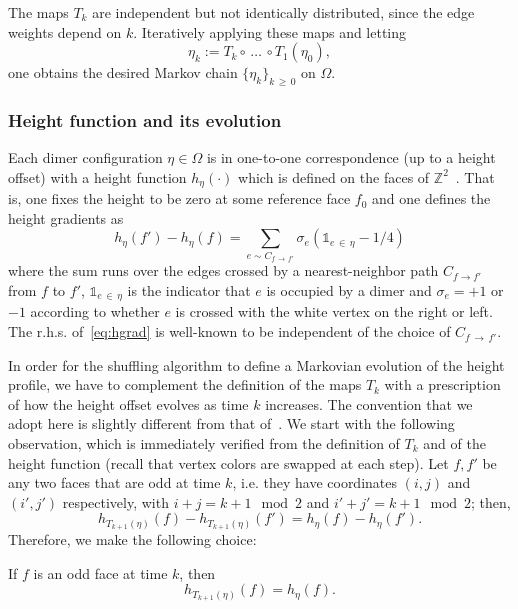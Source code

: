 \documentclass[AHL,Unicode,longabstracts,published]{cedram}
\newcommand{\bbZ}{\mathbb{Z}}
\newcommand{\dsun}{\mathds{1}}
\begin{document}
The maps $T_k$ are independent but not identically distributed, since the edge weights depend on $k$. Iteratively applying these maps and letting
\[
\eta_k:=T_{k}\circ\,\dots\,\circ T_1(\eta_0),
\]
one obtains the desired Markov chain $\{\eta_k\}_{k\,\ge\,0}$ on $\Omega$.

\subsubsection{Height function and its evolution}
Each dimer configuration $\eta\in \Omega$ is in one-to-one correspondence (up to a height offset) with a height function $h_\eta(\cdot)$ which is defined on the faces of $\bbZ^2$~\cite{KenLectures}. That is, one fixes the height to be zero at some reference face $f_0$ and one defines the height gradients as
\begin{equation}\label{eq:hgrad}
h_\eta(f')-h_\eta(f)=\sum_{e\sim C_{f\,\to\,f'}}\sigma_e (\dsun_{e\,\in\,\eta}-1/4)
\end{equation}
where the sum runs over the edges crossed by a nearest-neighbor path $C_{f\to f'}$ from $f$ to $f'$, $\dsun_{e\,\in\,\eta}$ is the indicator that $e$ is occupied by a dimer and $\sigma_e=+1$ or $-1$ according to whether $e$ is crossed with the white vertex on the right or left. The r.h.s. of~\eqref{eq:hgrad} is well-known to be independent of the choice of $C_{f\,\to\,f'}$.


In order for the shuffling algorithm to define a Markovian evolution of the height profile, we have to complement the definition of the maps $T_k$ with a prescription of how the height offset evolves as time $k$ increases. The convention that we adopt here is slightly different from that of~\cite{CT:18,zhang2018domino}. We start with the following observation, which is immediately verified from the definition of $T_k$ and of the height function (recall that vertex colors are swapped at each step). Let $f,f'$ be any two faces that are odd at time $k$, i.e. they have coordinates $(i,j)$ and $(i',j')$ respectively, with $i+j=k+1\mod 2$ and $i'+j'=k+1\mod 2$; then,
\[
h_{T_{k+1} (\eta)}(f)-h_{T_{k+1}(\eta)}(f')=h_{\eta}(f)-h_{\eta}(f').
\]
Therefore, we make the following choice:
\begin{defi}\label{def:ho}
If $f$ is an odd face at time $k$, then
\begin{equation}\label{eq:ch1}
h_{T_{k+1} (\eta)}(f)=h_{\eta}(f).
\end{equation}
\end{defi}
\end{document}
